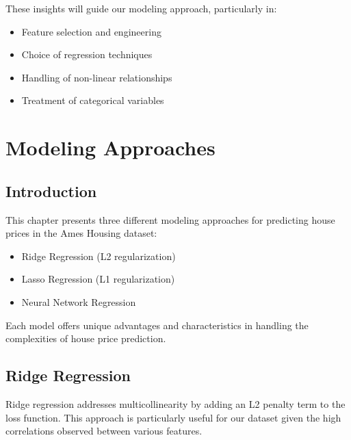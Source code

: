 \documentclass[12pt]{report}
\begin{document}
These insights will guide our modeling approach, particularly in:
\begin{itemize}
    \item Feature selection and engineering
    \item Choice of regression techniques
    \item Handling of non-linear relationships
    \item Treatment of categorical variables
\end{itemize}

\chapter{Modeling Approaches}

\section{Introduction}
This chapter presents three different modeling approaches for predicting house prices in the Ames Housing dataset:
\begin{itemize}
    \item Ridge Regression (L2 regularization)
    \item Lasso Regression (L1 regularization)
    \item Neural Network Regression
\end{itemize}

Each model offers unique advantages and characteristics in handling the complexities of house price prediction.

\section{Ridge Regression}
Ridge regression addresses multicollinearity by adding an L2 penalty term to the loss function. This approach is particularly useful for our dataset given the high correlations observed between various features.
\end{document}
